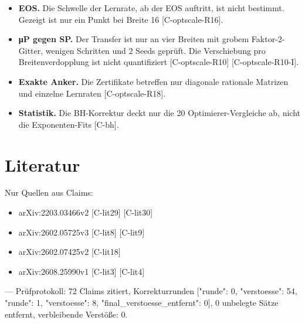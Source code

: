 \documentclass[10pt,twocolumn]{article}
\begin{document}
\begin{itemize}
\item \textbf{EOS.} Die Schwelle der Lernrate, ab der EOS auftritt, ist nicht bestimmt. Gezeigt ist nur ein Punkt bei Breite 16 {\scriptsize[C-optscale-R16]}.
\item \textbf{μP gegen SP.} Der Transfer ist nur an vier Breiten mit grobem Faktor-2-Gitter, wenigen Schritten und 2 Seeds geprüft. Die Verschiebung pro Breitenverdopplung ist nicht quantifiziert {\scriptsize[C-optscale-R10]} {\scriptsize[C-optscale-R10-I]}.
\item \textbf{Exakte Anker.} Die Zertifikate betreffen nur diagonale rationale Matrizen und einzelne Lernraten {\scriptsize[C-optscale-R18]}.
\item \textbf{Statistik.} Die BH-Korrektur deckt nur die 20 Optimierer-Vergleiche ab, nicht die Exponenten-Fits {\scriptsize[C-bh]}.
\end{itemize}

\section{Literatur}

Nur Quellen aus Claims:
\begin{itemize}
\item arXiv:2203.03466v2 {\scriptsize[C-lit29]} {\scriptsize[C-lit30]}
\item arXiv:2602.05725v3 {\scriptsize[C-lit8]} {\scriptsize[C-lit9]}
\item arXiv:2602.07425v2 {\scriptsize[C-lit18]}
\item arXiv:2608.25990v1 {\scriptsize[C-lit3]} {\scriptsize[C-lit4]}
\end{itemize}

---
Prüfprotokoll: 72 Claims zitiert, Korrekturrunden [{"runde": 0, "verstoesse": 54}, {"runde": 1, "verstoesse": 8}, {"final_verstoesse_entfernt": 0}], 0 unbelegte Sätze entfernt, verbleibende Verstöße: 0.
\end{document}
